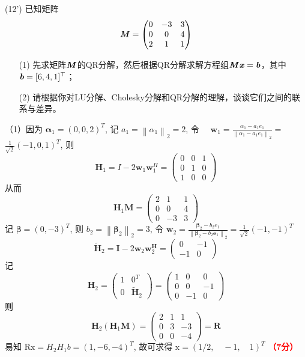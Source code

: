 \documentclass[12pt,a4paper,openany,twoside]{ctexbook}
\begin{document}
\begin{exercise}(12')
	已知矩阵\[ \boldsymbol{\mathit{M}} = \begin{pmatrix}
		0&-3&3\\0&0&4\\2&1&1
	\end{pmatrix}
	\]
	
	\begin{itemize}
		\item [(1)] 先求矩阵$\boldsymbol{\mathit{M}}$的QR分解，然后根据QR分解求解方程组$\boldsymbol{\mathit{M}} \boldsymbol{\mathit{x}} = \boldsymbol{\mathit{b}}$，其中$\boldsymbol{\mathit{b}}=[6, 4, 1]^\top$；
		\item [(2)] 请根据你对LU分解、Cholesky分解和QR分解的理解，谈谈它们之间的联系与差异。
	\end{itemize}
	
\end{exercise}
\begin{Solution}
	（1）因为 $\boldsymbol{\alpha}_1=(0,0,2)^T$, 记 $a_1=\left\|\alpha_1\right\|_2=2$, 令 $\quad \boldsymbol{w}_1=\frac{\alpha_1-a_1 e_1}{\left\|\alpha_1-a_1 e_1\right\|_2}=$ $\frac{1}{\sqrt{2}}(-1,0,1)^T$, 则
	$$
	\boldsymbol{H}_1=I-2 \boldsymbol{w}_1 \boldsymbol{w}_1^H=\left(\begin{array}{ccc}
		0 & 0 & 1 \\
		0 & 1 & 0 \\
		1 & 0 & 0
	\end{array}\right)
	$$
	从而
	$$
	\boldsymbol{H}_1 \boldsymbol{M}=\left(\begin{array}{ccc}
		2 & 1 & 1 \\
		0 & 0 & 4 \\
		0 & -3 & 3
	\end{array}\right)
	$$
	记 $\boldsymbol{\beta}=(0,-3)^T$, 则 $b_2=\left\|\boldsymbol{\beta}_2\right\|_2=3$, 令 $\boldsymbol{w}_2=\frac{\boldsymbol{\beta}_2-b_2 e_1}{\left\|\boldsymbol{\beta}_2-b_2 \boldsymbol{e}_1\right\|_2}=\frac{1}{\sqrt{2}}(-1,-1)^T$
	$$
	\widetilde{\boldsymbol{H}}_2=\boldsymbol{I}-2 \boldsymbol{w}_2 \boldsymbol{w}_2^{\boldsymbol{H}}=\left(\begin{array}{cc}
		0 & -1 \\
		-1 & 0
	\end{array}\right)
	$$
	记
	$$
	\boldsymbol{H}_2=\left(\begin{array}{cc}
		1 & 0^T \\
		0 & \widetilde{\boldsymbol{H}}_2
	\end{array}\right)=\left(\begin{array}{ccc}
		1 & 0 & 0 \\
		0 & 0 & -1 \\
		0 & -1 & 0
	\end{array}\right)
	$$
	则
	$$
	\boldsymbol{H}_2\left(\boldsymbol{H}_1 \boldsymbol{M}\right)=\left(\begin{array}{ccc}
		2 & 1 & 1 \\
		0 & 3 & -3 \\
		0 & 0 & -4
	\end{array}\right)=\boldsymbol{R}
	$$
	易知 $\mathrm{Rx}=H_2 H_1 b=(1,-6,-4)^T$, 故可求得
	$
	\mathrm{x}=(1 / 2, \quad-1, \quad 1)^T
	$ \hfill \textcolor{red}{\textbf{（7分）}}
	

\end{Solution}
\end{document}
